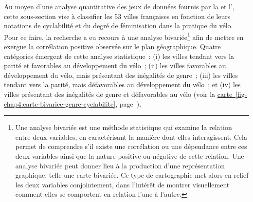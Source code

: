 \begin{refsegment}
Au moyen d'une analyse quantitative des jeux de données fournis par la \textcolor{blue}{\textcite{fub_barometre_2021}} et l'\textcolor{blue}{\textcite{insee_documentation_2023}}, cette sous-section vise à classifier les 53 villes françaises en fonction de leurs notations de cyclabilité et du degré de féminisation dans la pratique du vélo. Pour ce faire, la recherche a eu recours à une analyse bivariée\footnote{
    Une analyse bivariée est une méthode statistique qui examine la relation entre deux variables, en caractérisant la manière dont elles interagissent. Cela permet de comprendre s'il existe une corrélation ou une dépendance entre ces deux variables ainsi que la nature positive ou négative de cette relation. Une analyse bivariée peut donner lieu à la production d'une représentation graphique, telle une carte bivariée. Ce type de cartographie met alors en relief les deux variables conjointement, dans l'intérêt de montrer visuellement comment elles se comportent en relation l'une à l'autre.
} afin de mettre en exergue la corrélation positive observée sur le plan géographique. Quatre catégories émergent de cette analyse statistique~: (i) les villes tendant vers la parité et favorables au développement du vélo~; (ii) les villes favorables au développement du vélo, mais présentant des inégalités de genre~; (iii) les villes tendant vers la parité, mais défavorables au développement du vélo~; et (iv) les villes présentant des inégalités de genre et défavorables au vélo (voir la \hyperref[fig-chap4:carte-bivariee-genre-cyclabilite]{carte~\ref{fig-chap4:carte-bivariee-genre-cyclabilite}}, page~\pageref{fig-chap4:carte-bivariee-genre-cyclabilite}).%


\end{refsegment}
